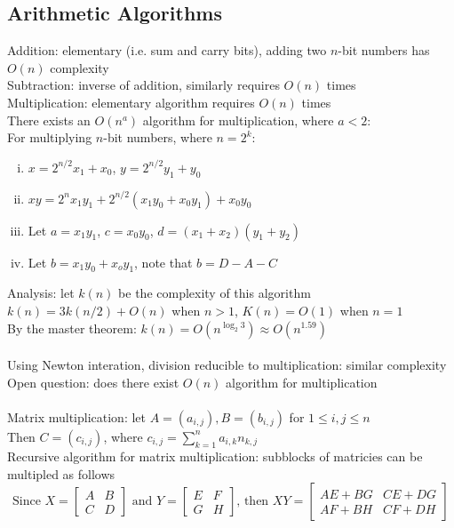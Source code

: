 \documentclass{article}
\begin{document}
		\subsection{Arithmetic Algorithms}
			Addition: elementary (i.e. sum and carry bits), adding two $n$-bit numbers has $O(n)$ complexity \\
			Subtraction: inverse of addition, similarly requires $O(n)$ times \\
			Multiplication: elementary algorithm requires $O(n)$ times
			\\
			There exists an $O(n^a)$ algorithm for multiplication, where $a < 2$: \\
			For multiplying $n$-bit numbers, where $n = 2^k$:
			\begin{enumerate}[(i)]
				\item $x = 2^{n/2}x_1 + x_0$, $y = 2^{n/2}y_1 + y_0$
				\item $xy = 2^nx_1y_1 + 2^{n/2}(x_1y_0 + x_0y_1) + x_0y_0$
				\item Let $a = x_1y_1$, $c = x_0y_0$, $d = (x_1 + x_2)(y_1 + y_2)$
				\item Let $b = x_1y_0 + x_oy_1$, note that $b = D - A - C$
				\end{enumerate}
			Analysis: let $k(n)$ be the complexity of this algorithm \\
			$k(n) = 3k(n/2) + O(n)$ when $n > 1$, $K(n) = O(1)$ when $n = 1$ \\
			By the master theorem: $k(n) = O(n^{\log_2 3}) \approx O(n^{1.59})$ \\
			\\
			Using Newton interation, division reducible to multiplication: similar complexity \\
			Open question: does there exist $O(n)$ algorithm for multiplication \\
			\\
			Matrix multiplication: let $A = (a_{i, j}), B = (b_{i ,j})$ for $1 \leq i, j \leq n$ \\
			Then $C = (c_{i, j})$, where $c_{i, j} = \sum_{k = 1}^n a_{i, k}n_{k, j}$ \\
			Recursive algorithm for matrix multiplication: subblocks of matricies can be multipled as follows
			\begin{equation*}
				\text{Since } X = \begin{bmatrix} A & B \\ C & D \end{bmatrix}
				\text{ and } Y = \begin{bmatrix} E & F \\ G & H \end{bmatrix}
				\text{, then } XY = \begin{bmatrix}	AE + BG & CE + DG \\ AF + BH & CF + DH \end{bmatrix}
				\end{equation*}
\end{document}

